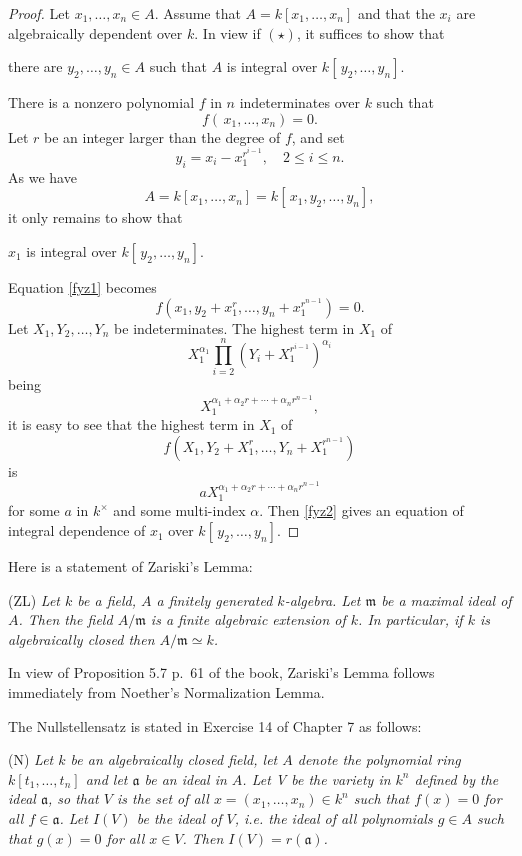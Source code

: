 \documentclass[12pt]{article}
\newcommand{\mf}{\mathfrak}
\begin{document}
\begin{proof} 
Let $x_1,\dots,x_n\in A$. Assume that $A=k[x_1,\dots,x_n]$ and that the $x_i$ are algebraically dependent over $k$. In view if $(\star)$, it suffices to show that\medskip

\centerline{there are $y_2,\dots,y_n\in A$ such that $A$ is integral over $k[\,y_2,\dots,y_n]$.}

There is a nonzero polynomial $f$ in $n$ indeterminates over $k$ such that
\begin{equation}\label{fyz1}
f(\,x_1,\dots,x_n) = 0.
\end{equation}
Let $r$ be an integer larger than the degree of $f$, and set
$$
y_i=x_i-x_1^{r^{i-1}},\quad2\le i \le n.
$$ 
As we have 
$$
A=k[x_1,\dots,x_n]=k[\,x_1,y_2,\dots,y_n],
$$
it only remains to show that\medskip

\centerline{$x_1$ is integral over $k[\,y_2,\dots,y_n]$.} 

Equation \eqref{fyz1} becomes 
\begin{equation}\label{fyz2}
f(x_1,y_2+x_1^r,\dots,y_n+x_1^{r^{n-1}})=0.
\end{equation}
Let $X_1,Y_2,\dots,Y_n$ be indeterminates. The highest term in $X_1$ of 
$$
X_1^{\alpha_1}\prod_{i=2}^n\left(Y_i + X_1^{r^{i-1}}\right)^{\alpha_i}
$$ 
being
$$
X_1^{\alpha_1+\alpha_2r+\cdots+\alpha_n r^{n-1}},
$$
it is easy to see that the highest term in $X_1$ of 
$$
f(X_1,Y_2+X_1^r,\dots,Y_n+X_1^{r^{n-1}})
$$ 
is 
$$
aX_1^{\alpha_1+\alpha_2r+\cdots+\alpha_n r^{n-1}}
$$
for some $a$ in $k^\times$ and some multi-index $\alpha$. Then \eqref{fyz2} gives an equation of integral dependence of $x_1$ over $k[\,y_2,\dots,y_n]$. 
\end{proof}

Here is a statement of Zariski's Lemma:

(ZL) \emph{Let $k$ be a field, $A$ a finitely generated $k$-algebra. Let $\mf m$ be a maximal ideal of $A$. Then the field $A/\mf m$ is a finite algebraic extension of $k$. In particular, if $k$ is algebraically closed then $A/\mf m\simeq k$.}

In view of Proposition 5.7 p.~61 of the book, Zariski's \- Lemma follows immediately from Noether's Normalization Lemma.

The Nullstellensatz is stated in Exercise 14 of Chapter 7 as follows:

(N) \emph{Let $k$ be an algebraically closed field, let $A$ denote the polynomial ring $k[t_1,\dots,t_n]$ and let $\mf a$ be an ideal in $A$. Let V be the variety in $k^n$ defined by the ideal $\mf a$, so that $V$ is the set of all $x=(x_1,\dots,x_n)\in k^n$ such that $f(x)=0$ for all $f\in\mf a$. Let $I(V)$ be the ideal of $V$, i.e. the ideal of all polynomials $g\in A$ such that $g(x)=0$ for all $x\in V$. Then $I(V)=r(\mf a)$.}
\end{document}
